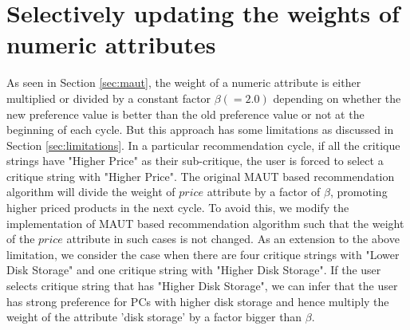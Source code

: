 \section{Selectively updating the weights of numeric attributes}
As seen in Section \ref{sec:maut}, the weight of a numeric attribute is either multiplied or divided by a constant factor $\beta (=2.0)$ depending on whether the new preference value is better than the old preference value or not at the beginning of each cycle.
But this approach has some limitations as discussed in Section \ref{sec:limitations}.
In a particular recommendation cycle, if all the critique strings have "Higher Price" as their sub-critique, the user is forced to select a critique string with "Higher Price".
The original MAUT based recommendation algorithm will divide the weight of $price$ attribute by a factor of $\beta$, promoting higher priced products in the next cycle.
To avoid this, we modify the implementation of MAUT based recommendation algorithm such that the weight of the $price$ attribute in such cases is not changed.
As an extension to the above limitation, we consider the case when there are four critique strings with "Lower Disk Storage" and one critique string with "Higher Disk Storage". 
If the user selects critique string that has "Higher Disk Storage", we can infer that the user has strong preference for PCs with higher disk storage and hence multiply the weight of the attribute 'disk storage' by a factor bigger than $\beta$.

